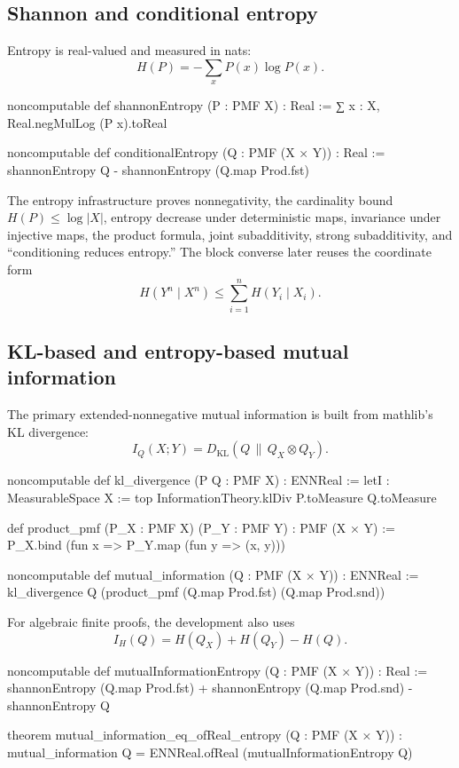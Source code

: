 \documentclass[11pt]{article}
\newcommand{\MI}{I}
\newcommand{\KL}{D_{\mathrm{KL}}}
\begin{document}
\subsection{Shannon and conditional entropy}

Entropy is real-valued and measured in nats:
\[
  H(P)=-\sum_x P(x)\log P(x).
\]

\begin{LeanCode}
noncomputable def shannonEntropy (P : PMF X) : Real :=
  ∑ x : X, Real.negMulLog (P x).toReal

noncomputable def conditionalEntropy (Q : PMF (X × Y)) : Real :=
  shannonEntropy Q - shannonEntropy (Q.map Prod.fst)
\end{LeanCode}

The entropy infrastructure proves nonnegativity, the cardinality bound
$H(P)\le\log|X|$, entropy decrease under deterministic maps, invariance under
injective maps, the product formula, joint subadditivity, strong subadditivity,
and ``conditioning reduces entropy.''  The block converse later reuses the
coordinate form
\[
  H(Y^n\mid X^n)\le \sum_{i=1}^n H(Y_i\mid X_i).
\]

\subsection{KL-based and entropy-based mutual information}

The primary extended-nonnegative mutual information is built from mathlib's
KL divergence:
\[
  \MI_Q(X;Y)=\KL(Q\,\|\,Q_X\otimes Q_Y).
\]

\begin{LeanCode}
noncomputable def kl_divergence (P Q : PMF X) : ENNReal :=
  letI : MeasurableSpace X := top
  InformationTheory.klDiv P.toMeasure Q.toMeasure

def product_pmf (P_X : PMF X) (P_Y : PMF Y) : PMF (X × Y) :=
  P_X.bind (fun x => P_Y.map (fun y => (x, y)))

noncomputable def mutual_information (Q : PMF (X × Y)) : ENNReal :=
  kl_divergence Q (product_pmf (Q.map Prod.fst) (Q.map Prod.snd))
\end{LeanCode}

For algebraic finite proofs, the development also uses
\[
  I_H(Q)=H(Q_X)+H(Q_Y)-H(Q).
\]

\begin{LeanCode}
noncomputable def mutualInformationEntropy (Q : PMF (X × Y)) : Real :=
  shannonEntropy (Q.map Prod.fst) +
    shannonEntropy (Q.map Prod.snd) - shannonEntropy Q

theorem mutual_information_eq_ofReal_entropy (Q : PMF (X × Y)) :
  mutual_information Q =
    ENNReal.ofReal (mutualInformationEntropy Q)
\end{LeanCode}
\end{document}
